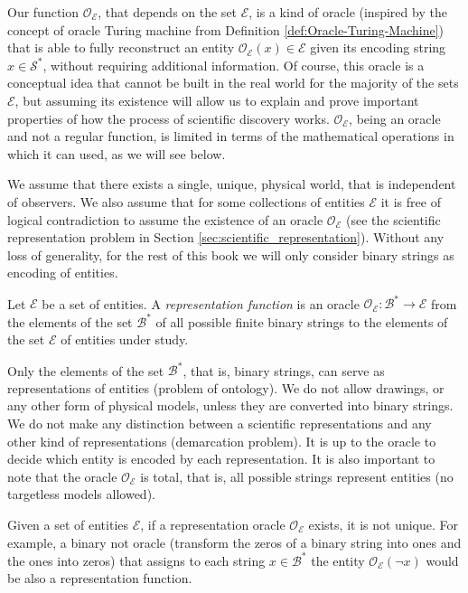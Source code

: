 Our function $\mathcal{O}_\mathcal{E}$, that depends on the set $\mathcal{E}$, is a kind of oracle (inspired by the concept of oracle Turing machine from Definition \ref{def:Oracle-Turing-Machine}) that is able to fully reconstruct an entity $\mathcal{O}_\mathcal{E} (x) \in \mathcal{E}$ given its encoding string $x \in \mathcal{S}^\ast$, without requiring additional information. Of course, this oracle is a conceptual idea that cannot be built in the real world for the majority of the sets $\mathcal{E}$, but assuming its existence will allow us to explain and prove important properties of how the process of scientific discovery works. $\mathcal{O}_\mathcal{E}$, being an oracle and not a regular function, is limited in terms of the mathematical operations in which it can used, as we will see below.

We assume that there exists a single, unique, physical world, that is independent of observers. We also assume that for some collections of entities $\mathcal{E}$ it is free of logical contradiction to assume the existence of an oracle $\mathcal{O}_\mathcal{E}$ (see the scientific representation problem in Section \ref{sec:scientific_representation}). Without any loss of generality, for the rest of this book we will only consider binary strings as encoding of entities.

\begin{definition}
\label{def:descriptions_topic}
Let $\mathcal{E}$ be a set of entities. A \emph{representation function} is an oracle $\mathcal{O}_\mathcal{E}:\mathcal{B}^\ast \rightarrow \mathcal{E}$ from the elements of the set $\mathcal{B}^\ast$ of all possible finite binary strings to the elements of the set $\mathcal{E}$ of entities under study.
\end{definition}

Only the elements of the set $\mathcal{B}^\ast$, that is, binary strings, can serve as representations of entities (problem of ontology). We do not allow drawings, or any other form of physical models, unless they are converted into binary strings. We do not make any distinction between a scientific representations and any other kind of representations (demarcation problem). It is up to the oracle to decide which entity is encoded by each representation. It is also important to note that the oracle $\mathcal{O}_\mathcal{E}$ is total, that is, all possible strings represent entities (no targetless models allowed).

\begin{example}
\label{ex:not_unique_oracle}
Given a set of entities $\mathcal{E}$, if a representation oracle $\mathcal{O}_\mathcal{E}$ exists, it is not unique. For example, a binary not oracle (transform the zeros of a binary string into ones and the ones into zeros) that assigns to each string $x \in \mathcal{B}^\ast$ the entity $\mathcal{O}_\mathcal{E} \left( \neg x \right)$ would be also a representation function.
\end{example}

